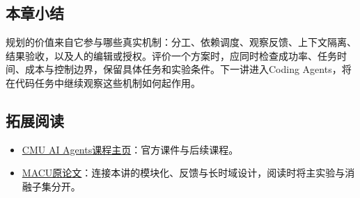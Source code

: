 \documentclass[11pt,a4paper]{article}
\begin{document}
\subsection{本章小结}
规划的价值来自它参与哪些真实机制：分工、依赖调度、观察反馈、上下文隔离、结果验收，以及人的编辑或授权。评价一个方案时，应同时检查成功率、任务时间、成本与控制边界，保留具体任务和实验条件。下一讲进入Coding Agents，将在代码任务中继续观察这些机制如何起作用。
\subsection{拓展阅读}
\begin{itemize}
\item \href{https://www.cmu-agents.com/}{CMU AI Agents课程主页}：官方课件与后续课程。
\item \href{https://arxiv.org/abs/2606.01533}{MACU原论文}：连接本讲的模块化、反馈与长时域设计，阅读时将主实验与消融子集分开。
\end{itemize}
\end{document}
